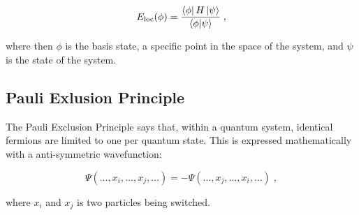 \begin{equation}
    E_{\text{loc}}(\phi) = \frac{\bra{\phi}H\ket{\psi}}{\braket{\phi}{\psi}} \; ,
\end{equation}

where then $\phi$ is the basis state, a specific point in the space of the system, and $\psi$ is the state of the system.

\subsection{Pauli Exlusion Principle}

The Pauli Exclusion Principle says that, within a quantum system, identical fermions are limited to one per quantum state. This is expressed mathematically with a anti-symmetric wavefunction:

\begin{equation}
    \Psi(\dots,x_i,\dots,x_j,\dots) =-\Psi(\dots,x_j,\dots,x_i,\dots) \; ,
\end{equation}

where $x_i$ and $x_j$ is two particles being switched.